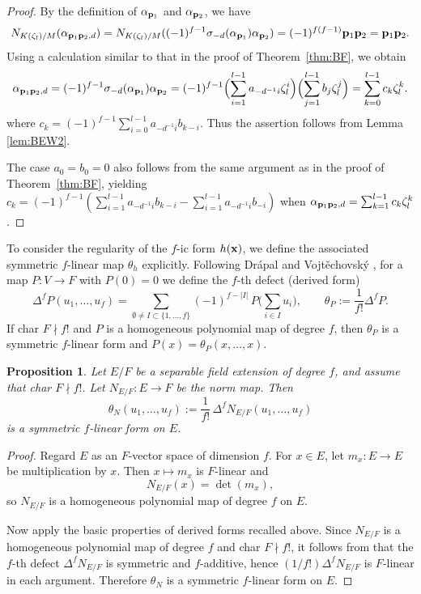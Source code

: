\documentclass[a4paper, 11pt]{amsart}
\theoremstyle{plain}
\newtheorem{prop}[thm]{Proposition}
\theoremstyle{definition}
\numberwithin{equation}{section}
\begin{document}
\begin{proof}
By the definition of $\alpha_{{\bf p}_1}$ and $\alpha_{{\bf p}_2}$, we have
\begin{align*}
N_{K(\zeta_l)/M}(\alpha_{{\bf p}_1{\bf p}_2,d})
=N_{K(\zeta_l)/M}((-1)^{f-1}\sigma_{-d}(\alpha_{{\bf p}_1})
\alpha_{{\bf p}_2})
=(-1)^{f(f-1)}{\bf p}_1{\bf p}_2={\bf p}_1{\bf p}_2.
\end{align*}
Using a calculation similar to that in the proof of Theorem~\ref{thm:BF}, we obtain
\begin{align*}
\alpha_{{\bf p}_1{\bf p}_2,d}=(-1)^{f-1}\sigma_{-d}(\alpha_{{\bf p}_1})\alpha_{{\bf p}_2}=(-1)^{f-1}\Bigl(\sum_{i=1}^{l-1}a_{-d^{-1}i}\zeta_l^i\Bigr) \Bigl(\sum_{j=1}^{l-1}b_j\zeta_l^j\Bigr)=\sum_{k=0}^{l-1}c_k\zeta_l^k.
\end{align*}
where $c_k=(-1)^{f-1}\sum_{i=0}^{l-1}a_{-d^{-1}i}b_{k-i}$. 
Thus the assertion follows from Lemma \ref{lem:BEW2}.

The case $a_0=b_0=0$ also follows from the same argument as in the proof of Theorem~\ref{thm:BF}, yielding $c_k=(-1)^{f-1}(\sum_{i=1}^{l-1}a_{-d^{-1}i}b_{k-i} - \sum_{i=1}^{l-1}a_{-d^{-1}i}b_{-i})$ 
when $\alpha_{{\bf p}_1{\bf p}_2,d}=\sum_{k=1}^{l-1}c_k\zeta_l^k$.
\end{proof}

To consider the regularity of the $f$-ic form $h({\bf x})$, we define the associated symmetric $f$-linear map $\theta_h$ explicitly.
Following Dr\'apal and Vojt\v{e}chovsk\'y \cite[\S2.1]{DV09}, for a map $P\colon V\to F$
with $P(0)=0$ we define the $f$-th defect (derived form)
\[
\Delta^{f}P(u_1,\dots,u_f)
=\sum_{\emptyset\neq I\subset\{1,\dots,f\}}(-1)^{f-|I|}
\,P\Big(\sum_{i\in I}u_i\Big),
\qquad
\theta_P:=\frac{1}{f!}\Delta^{f}P.
\]
If char $F\nmid f!$ and $P$ is a homogeneous polynomial map of degree $f$, then
$\theta_P$ is a symmetric $f$-linear form and $P(x)=\theta_P(x,\dots,x)$.

\begin{prop}\label{prop:norm_polarization}
Let $E/F$ be a separable field extension of degree $f$, and assume that char $F \nmid f!$. 
Let $N_{E/F}\colon E\to F$ be the norm map.
Then
\[
\theta_N(u_1,\dots,u_f):=\frac{1}{f!}\,\Delta^f N_{E/F}(u_1,\dots,u_f)
\]
is a symmetric $f$-linear form on $E$.
\end{prop}

\begin{proof}
Regard $E$ as an $F$-vector space of dimension $f$. 
For $x\in E$, let $m_x\colon E\to E$ be multiplication by $x$. 
Then $x\mapsto m_x$ is $F$-linear and
\[
N_{E/F}(x)=\det(m_x),
\]
so $N_{E/F}$ is a homogeneous polynomial map of degree $f$ on $E$.

Now apply the basic properties of derived forms recalled above.
Since $N_{E/F}$ is a homogeneous polynomial map of degree $f$ and
char $F\nmid f!$, it follows from \cite[\S2.1]{DV09} that the $f$-th defect
$\Delta^f N_{E/F}$ is symmetric and $f$-additive, hence $(1/f!)\Delta^f N_{E/F}$ is $F$-linear
in each argument. 
Therefore $\theta_N$ is a symmetric $f$-linear form on $E$.
\end{proof}
\end{document}
